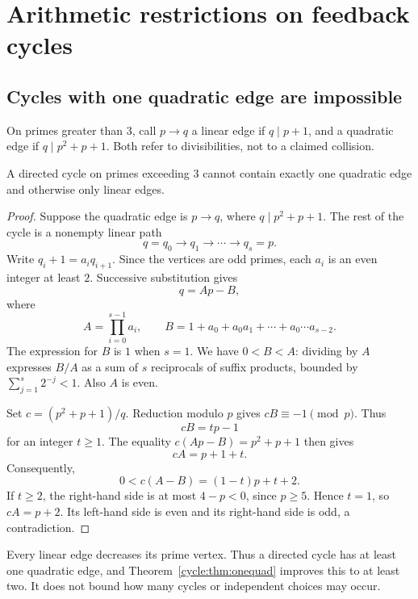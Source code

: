 \chapter{Arithmetic restrictions on feedback cycles}\label{ch:cycle}
\section{Cycles with one quadratic edge are impossible}
On primes greater than $3$, call $p\to q$ a linear edge if $q\mid p+1$, and a quadratic edge if $q\mid p^2+p+1$. Both refer to divisibilities, not to a claimed collision.

\begin{theorem}\label{cycle:thm:onequad}
A directed cycle on primes exceeding $3$ cannot contain exactly one quadratic edge and otherwise only linear edges.
\end{theorem}
\begin{proof}
Suppose the quadratic edge is $p\to q$, where $q\mid p^2+p+1$. The rest of the cycle is a nonempty linear path
\[
 q=q_0\longrightarrow q_1\longrightarrow\cdots\longrightarrow q_s=p.
\]
Write $q_i+1=a_iq_{i+1}$. Since the vertices are odd primes, each $a_i$ is an even integer at least $2$. Successive substitution gives
\[
 q=Ap-B,
\]
where
\[
 A=\prod_{i=0}^{s-1}a_i,\qquad
 B=1+a_0+a_0a_1+\cdots+a_0\cdots a_{s-2}.
\]
The expression for $B$ is $1$ when $s=1$. We have $0<B<A$: dividing by $A$ expresses $B/A$ as a sum of $s$ reciprocals of suffix products, bounded by $\sum_{j=1}^s2^{-j}<1$. Also $A$ is even.

Set $c=(p^2+p+1)/q$. Reduction modulo $p$ gives $cB\equiv-1\pmod p$. Thus
\[
 cB=tp-1
\]
for an integer $t\ge1$. The equality $c(Ap-B)=p^2+p+1$ then gives
\[
 cA=p+1+t.
\]
Consequently,
\[
 0<c(A-B)=(1-t)p+t+2.
\]
If $t\ge2$, the right-hand side is at most $4-p<0$, since $p\ge5$. Hence $t=1$, so $cA=p+2$. Its left-hand side is even and its right-hand side is odd, a contradiction.
\end{proof}

Every linear edge decreases its prime vertex. Thus a directed cycle has at least one quadratic edge, and Theorem~\ref{cycle:thm:onequad} improves this to at least two. It does not bound how many cycles or independent choices may occur.

